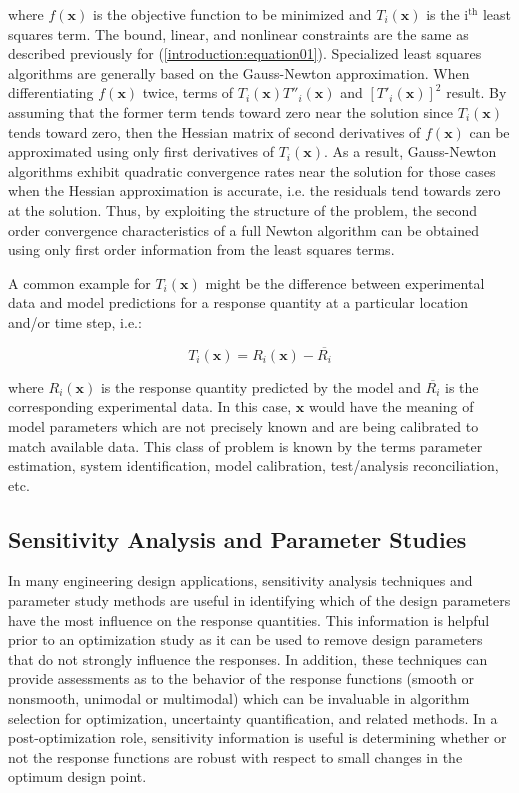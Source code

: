 where $f(\mathbf{x})$ is the objective function to be minimized and
$T_i(\mathbf{x})$ is the i$^{\mathrm{th}}$ least squares term. The
bound, linear, and nonlinear constraints are the same as described
previously for (\ref{introduction:equation01}).  Specialized least
squares algorithms are generally based on the Gauss-Newton
approximation. When differentiating $f(\mathbf{x})$ twice, terms of
$T_i(\mathbf{x})T''_i(\mathbf{x})$ and $[T'_i(\mathbf{x})]^{2}$
result. By assuming that the former term tends toward zero near the
solution since $T_i(\mathbf{x})$ tends toward zero, then the Hessian
matrix of second derivatives of $f(\mathbf{x})$ can be approximated
using only first derivatives of $T_i(\mathbf{x})$.  As a result,
Gauss-Newton algorithms exhibit quadratic convergence rates near the
solution for those cases when the Hessian approximation is accurate,
i.e. the residuals tend towards zero at the solution.  Thus, by
exploiting the structure of the problem, the second order convergence
characteristics of a full Newton algorithm can be obtained using only
first order information from the least squares terms.

A common example for $T_i(\mathbf{x})$ might be the difference
between experimental data and model predictions for a response
quantity at a particular location and/or time step, i.e.:

\begin{equation}
  T_i(\mathbf{x}) = R_i(\mathbf{x})-\overline{R_i}
  \label{introduction:equation03}
\end{equation}

where $R_i(\mathbf{x})$ is the response quantity predicted by the
model and $\overline{R_i}$ is the corresponding experimental data.
In this case, $\mathbf{x}$ would have the meaning of model parameters
which are not precisely known and are being calibrated to match
available data. This class of problem is known by the terms parameter
estimation, system identification, model calibration, test/analysis
reconciliation, etc.

\subsection{Sensitivity Analysis and Parameter Studies}\label{introduction:background:sensitivity}

In many engineering design applications, sensitivity analysis
techniques and parameter study methods are useful in identifying which
of the design parameters have the most influence on the response
quantities. This information is helpful prior to an optimization study
as it can be used to remove design parameters that do not strongly
influence the responses. In addition, these techniques can provide
assessments as to the behavior of the response functions (smooth or
nonsmooth, unimodal or multimodal) which can be invaluable in
algorithm selection for optimization, uncertainty quantification, and
related methods. In a post-optimization role, sensitivity information
is useful is determining whether or not the response functions are
robust with respect to small changes in the optimum design point.

